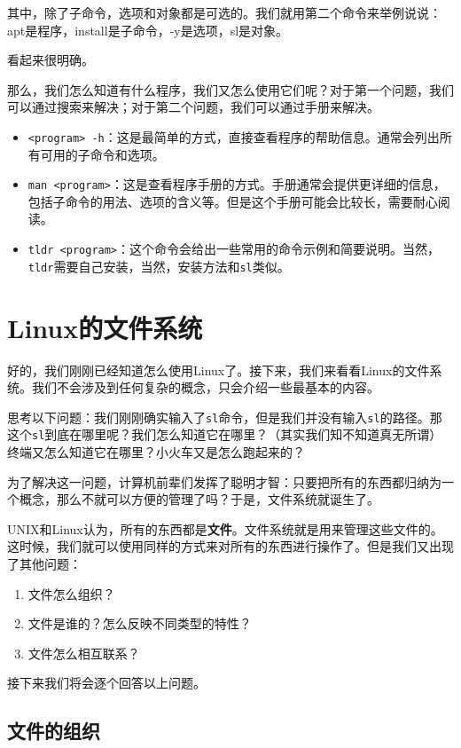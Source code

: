 \documentclass[../main.tex]{subfiles}
\begin{document}
其中，除了子命令，选项和对象都是可选的。我们就用第二个命令来举例说说：apt是程序，install是子命令，-y是选项，sl是对象。

看起来很明确。

那么，我们怎么知道有什么程序，我们又怎么使用它们呢？对于第一个问题，我们可以通过搜索来解决；对于第二个问题，我们可以通过手册来解决。

\begin{itemize}
  \item \texttt{<program> -h}：这是最简单的方式，直接查看程序的帮助信息。通常会列出所有可用的子命令和选项。
  \item \texttt{man <program>}：这是查看程序手册的方式。手册通常会提供更详细的信息，包括子命令的用法、选项的含义等。但是这个手册可能会比较长，需要耐心阅读。
  \item \texttt{tldr <program>}：这个命令会给出一些常用的命令示例和简要说明。当然，\texttt{tldr}需要自己安装，当然，安装方法和\texttt{sl}类似。
\end{itemize}

\section{Linux的文件系统}

好的，我们刚刚已经知道怎么使用Linux了。接下来，我们来看看Linux的文件系统。我们不会涉及到任何复杂的概念，只会介绍一些最基本的内容。

思考以下问题：我们刚刚确实输入了\texttt{sl}命令，但是我们并没有输入\texttt{sl}的路径。那这个\texttt{sl}到底在哪里呢？我们怎么知道它在哪里？（其实我们知不知道真无所谓）终端又怎么知道它在哪里？小火车又是怎么跑起来的？

为了解决这一问题，计算机前辈们发挥了聪明才智：只要把所有的东西都归纳为一个概念，那么不就可以方便的管理了吗？于是，文件系统就诞生了。

UNIX和Linux认为，所有的东西都是\textbf{文件}。文件系统就是用来管理这些文件的。这时候，我们就可以使用同样的方式来对所有的东西进行操作了。但是我们又出现了其他问题：

\begin{enumerate}
  \item 文件怎么组织？
  \item 文件是谁的？怎么反映不同类型的特性？
  \item 文件怎么相互联系？
\end{enumerate}

接下来我们将会逐个回答以上问题。

\subsection{文件的组织}
\end{document}
